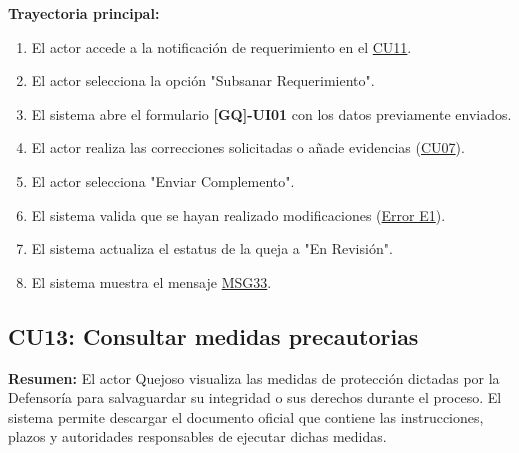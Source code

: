 \begin{appendices}
\textbf{Trayectoria principal:}
\begin{enumerate}[nosep]
    \item El actor accede a la notificación de requerimiento en el \hyperlink{anexo:casos_uso}{CU11}.
    \item El actor selecciona la opción "Subsanar Requerimiento".
    \item El sistema abre el formulario \textbf{[GQ]-UI01} con los datos previamente enviados.
    \item El actor realiza las correcciones solicitadas o añade evidencias (\hyperlink{anexo:casos_uso}{CU07}).
    \item El actor selecciona "Enviar Complemento".
    \item El sistema valida que se hayan realizado modificaciones (\hyperlink{err:E17}{Error E1}).
    \item El sistema actualiza el estatus de la queja a "En Revisión".
    \item El sistema muestra el mensaje \hyperlink{msg:MSG33}{MSG33}.
\end{enumerate}

\subsection{CU13: Consultar medidas precautorias}

\textbf{Resumen:} 
El actor Quejoso visualiza las medidas de protección dictadas por la Defensoría para salvaguardar su integridad o sus derechos durante el proceso. El sistema permite descargar el documento oficial que contiene las instrucciones, plazos y autoridades responsables de ejecutar dichas medidas.


\end{appendices}
